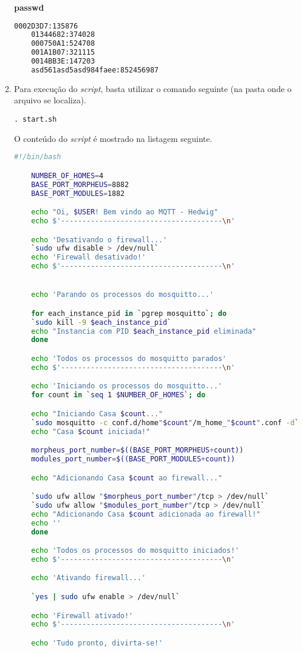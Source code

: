 \begin{enumerate}
\textbf{passwd}

\begin{lstlisting}[language=bash]
    0002D3D7:135876
    01344682:374028
    000750A1:524708
    001A1B07:321115
    0014BB3E:147203
    asd561asd5asd984faee:852456987
\end{lstlisting}

\item Para execução do \emph{script}, basta utilizar o comando seguinte (na pasta onde o arquivo se localiza).

\lstinline{. start.sh}

O conteúdo do \emph{script} é mostrado na listagem seguinte.

\begin{lstlisting}[language=bash]
    #!/bin/bash

    NUMBER_OF_HOMES=4
    BASE_PORT_MORPHEUS=8882
    BASE_PORT_MODULES=1882

    echo "Oi, $USER! Bem vindo ao MQTT - Hedwig"
    echo $'--------------------------------------\n'

    echo 'Desativando o firewall...'
    `sudo ufw disable > /dev/null`
    echo 'Firewall desativado!'
    echo $'--------------------------------------\n'


    echo 'Parando os processos do mosquitto...'

    for each_instance_pid in `pgrep mosquitto`; do
    `sudo kill -9 $each_instance_pid`
    echo "Instancia com PID $each_instance_pid eliminada"
    done

    echo 'Todos os processos do mosquitto parados'
    echo $'--------------------------------------\n'

    echo 'Iniciando os processos do mosquitto...'
    for count in `seq 1 $NUMBER_OF_HOMES`; do

    echo "Iniciando Casa $count..."
    `sudo mosquitto -c conf.d/home"$count"/m_home_"$count".conf -d`
    echo "Casa $count iniciada!"

    morpheus_port_number=$((BASE_PORT_MORPHEUS+count))
    modules_port_number=$((BASE_PORT_MODULES+count))

    echo "Adicionando Casa $count ao firewall..."

    `sudo ufw allow "$morpheus_port_number"/tcp > /dev/null`
    `sudo ufw allow "$modules_port_number"/tcp > /dev/null`
    echo "Adicionando Casa $count adicionada ao firewall!"
    echo ''
    done

    echo 'Todos os processos do mosquitto iniciados!'
    echo $'--------------------------------------\n'

    echo 'Ativando firewall...'

    `yes | sudo ufw enable > /dev/null`

    echo 'Firewall ativado!'
    echo $'--------------------------------------\n'

    echo 'Tudo pronto, divirta-se!'
\end{lstlisting}

\end{enumerate}

